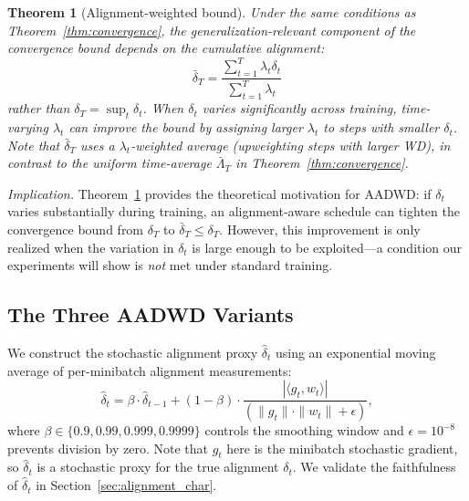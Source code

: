 \documentclass{article}
\newtheorem{theorem}{Theorem}
\begin{document}
\begin{theorem}[Alignment-weighted bound]
  \label{thm:alignment_weighted}
  Under the same conditions as Theorem~\ref{thm:convergence}, the
  generalization-relevant component of the convergence bound depends on the
  cumulative alignment:
  \begin{equation}
    \bar{\delta}_T = \frac{\sum_{t=1}^{T} \lambda_t \delta_t}
                         {\sum_{t=1}^{T} \lambda_t}
  \end{equation}
  rather than $\delta_T = \sup_t \delta_t$.
  When $\delta_t$ varies significantly across training, time-varying $\lambda_t$ can
  improve the bound by assigning larger $\lambda_t$ to steps with smaller $\delta_t$.
  Note that $\bar{\delta}_T$ uses a $\lambda_t$-weighted average (upweighting steps
  with larger WD), in contrast to the uniform time-average $\bar{\Lambda}_T$ in
  Theorem~\ref{thm:convergence}.
\end{theorem}

\emph{Implication.}
Theorem~\ref{thm:alignment_weighted} provides the theoretical motivation for AADWD:
if $\delta_t$ varies substantially during training, an alignment-aware schedule can
tighten the convergence bound from $\delta_T$ to $\bar{\delta}_T \leq \delta_T$.
However, this improvement is only realized when the variation in $\delta_t$ is large
enough to be exploited---a condition our experiments will show is \emph{not} met
under standard training.

\subsection{The Three AADWD Variants}
\label{sec:variants}

We construct the stochastic alignment proxy $\hat{\delta}_t$ using an exponential
moving average of per-minibatch alignment measurements:
\begin{equation}
  \hat{\delta}_t = \beta \cdot \hat{\delta}_{t-1}
                 + (1 - \beta) \cdot
                   \frac{|\langle g_t, w_t \rangle|}
                        {(\|g_t\| \cdot \|w_t\| + \epsilon)},
\end{equation}
where $\beta \in \{0.9, 0.99, 0.999, 0.9999\}$ controls the smoothing window and
$\epsilon = 10^{-8}$ prevents division by zero.
Note that $g_t$ here is the minibatch stochastic gradient, so $\hat{\delta}_t$ is a
stochastic proxy for the true alignment $\delta_t$.
We validate the faithfulness of $\hat{\delta}_t$ in
Section~\ref{sec:alignment_char}.
\end{document}

